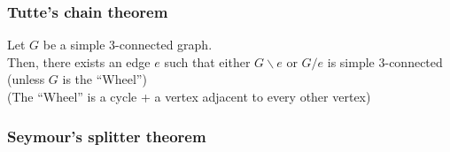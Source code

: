             \subsubsection{Tutte's chain theorem}
                Let $G$ be a simple $3$-connected graph.\\
                Then, there exists an edge $e$ such that either $G\backslash e$ or $G/e$ is simple $3$-connected (unless $G$ is the ``Wheel'')\\
                (The ``Wheel'' is a cycle + a vertex adjacent to every other vertex)
                \subsubsection{Seymour's splitter theorem}
